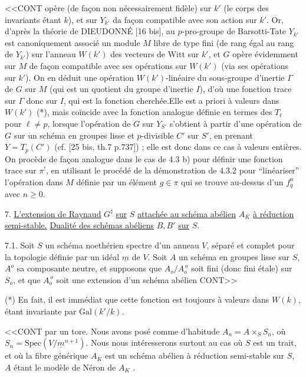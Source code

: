 <<CONT opère (de façon non nécessairement fidèle) sur $k'$ (le corps des invariants étant $k$), et sur $Y_{k'}$ da façon compatible avec son action sur $k'$. Or, d'après la théorie de DIEUDONNÉ [16 bis], au $p$-pro-groupe de Barsotti-Tate $Y_{k'}$ est canoniquement associé  un module $M$ libre de type fini (de rang égal au rang de $Y_{k'}$) sur l'anneau $W(k')$ des vecteurs de Witt sur $k'$, et $G$ opère évidemment sur $M$ de façon compatible avec ses opérations sur $W(k')$ (via ses opérations sur $k'$). On en déduit une opération $W(k')$-linéaire du sous-groupe d'inertie $\Gamma$ de $G$ sur $M$ (qui est un quotient du groupe d'inertie $I$), d'où une fonction trace sur $\Gamma$ donc sur $I$, qui est la fonction cherchée.Elle est a priori à valeurs dans $W(k')$ (*), mais coïncide avec la fonction analogue définie en termes des $T_\ell$ pour $\ell \neq p$, lorsque l'opération de $G$ sur $Y_{S'}$ s'obtient à partir d'une opération de $G$ sur un schéma en groupes lisse et $p$-divisible $C'$ sur $S'$, en prenant $Y = T_p(C')$ (cf. [25 bis, th.7 p.737]) ; elle est donc dans ce cas à valeurs entières. On procède de façon analogue dans le cas de 4.3 b) pour définir une fonction trace sur $\pi^!$, en utilisant le procédé de la démonstration de 4.3.2 pour ``linéariser'' l'opération dans $M$ définie par un élément $g \in \pi$ qui se trouve au-dessus d'un $f_q^n$ avec $n \geqslant 0$.


7. \underline{L'extension de Raynaud} $G^\natural$ \underline{sur} $S$ \underline{attachée au schéma abélien} $A_K$ \underline{à réduction semi-stable.} \underline{Dualité des schémas abéliens} $B,B'$ \underline{sur} $S$.

7.1.  Soit $S$ un schéma noethérien spectre d'un anneau $V$, séparé et complet pour la topologie définie par un idéal $\underline{m}$ de $V$. Soit $A$ un schéma en groupes lisse sur $S$, $A^o$ sa composante neutre, et supposons que $A_o/A_o^{\,o}$ soit fini (donc fini étale) sur $S_o$, et que $A_o^{\,o}$ soit une extension d'un schéma abélien CONT>>

(*) En fait, il est immédiat que cette fonction est toujours à valeurs dans $W(k)$, étant invariante par $\mathrm{Gal}(k'/k)$.



<<CONT par un tore. Nous avons posé comme d'habitude $A_n = A\times_S S_n$, où $S_n = \mathrm{Spec}(V/\underline{m}^{n+1})$. Nous nous intéresserons surtout au cas où $S$ est un trait, et où la fibre générique $A_K$ est un schéma abélien à réduction semi-stable sur $S$, $A$ étant le modèle de Néron de $A_K$ .

